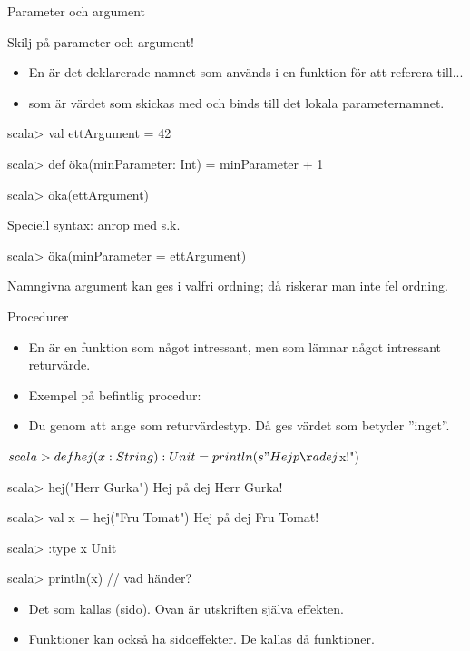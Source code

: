 \begin{Slide}{Parameter och argument}

Skilj på parameter och argument!
\begin{itemize}
\item En  är det deklarerade namnet som används  i en funktion för att referera till...

\item {} som är värdet som skickas med  och binds till det lokala parameternamnet.

\end{itemize}


\begin{REPLnonum}
scala> val ettArgument = 42

scala> def öka(minParameter: Int) = minParameter + 1

scala> öka(ettArgument)
\end{REPLnonum}


Speciell syntax: anrop med s.k. 
\begin{REPLnonum}
scala> öka(minParameter = ettArgument)
\end{REPLnonum}
{\SlideFontSmall Namngivna argument kan ges i valfri ordning; då riskerar man inte fel ordning.}

\end{Slide}

\begin{Slide}{Procedurer}\SlideFontSmall
\begin{itemize}
\item En  är en funktion som  något intressant, men som  lämnar något intressant returvärde.
\item Exempel på befintlig procedur: 
\item Du  genom att ange \texttt{} som returvärdestyp. Då ges värdet \texttt{\Alert{()}} som betyder ''inget''.
\end{itemize}
\begin{REPLsmall}$%
scala> def hej(x: String): Unit = println(s"Hej på dej $x!")

scala> hej("Herr Gurka")
Hej på dej Herr Gurka!

scala> val x = hej("Fru Tomat")
Hej på dej Fru Tomat!

scala> :type x 
Unit

scala> println(x)    // vad händer?
\end{REPLsmall}
\begin{itemize}
\item Det som  kallas (sido). Ovan är utskriften själva effekten.
\item Funktioner kan också ha sidoeffekter. De kallas då  funktioner.
\end{itemize}
\end{Slide}

